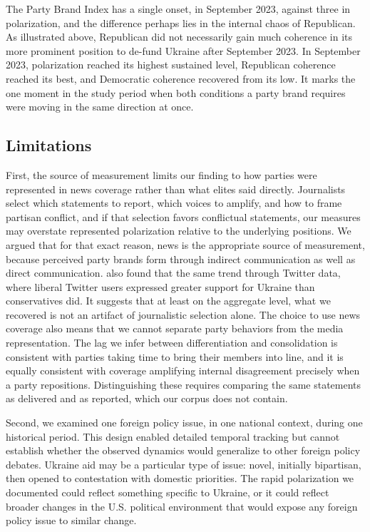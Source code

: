 The Party Brand Index has a single onset, in September 2023, against three in polarization, and the difference perhaps lies in the internal chaos of Republican. As illustrated above, Republican did not necessarily gain much coherence in its more prominent position to de-fund Ukraine after September 2023. In September 2023, polarization reached its highest sustained level, Republican coherence reached its best, and Democratic coherence recovered from its low. It marks the one moment in the study period when both conditions a party brand requires were moving in the same direction at once.

\subsection{Limitations}

First, the source of measurement limits our finding to how parties were represented in news coverage rather than what elites said directly. Journalists select which statements to report, which voices to amplify, and how to frame partisan conflict, and if that selection favors conflictual statements, our measures may overstate represented polarization relative to the underlying positions. We argued that for that exact reason, news is the appropriate source of measurement, because perceived party brands form through indirect communication as well as direct communication. \citet{nomikosAmericanSocialMedia2025} also found that the same trend through Twitter data, where liberal Twitter users expressed greater support for Ukraine than conservatives did. It suggests that at least on the aggregate level, what we recovered is not an artifact of journalistic selection alone. The choice to use news coverage also means that we cannot separate party behaviors from the media representation. The lag we infer between differentiation and consolidation is consistent with parties taking time to bring their members into line, and it is equally consistent with coverage amplifying internal disagreement precisely when a party repositions. Distinguishing these requires comparing the same statements as delivered and as reported, which our corpus does not contain.

Second, we examined one foreign policy issue, in one national context, during one historical period. This design enabled detailed temporal tracking but cannot establish whether the observed dynamics would generalize to other foreign policy debates. Ukraine aid may be a particular type of issue: novel, initially bipartisan, then opened to contestation with domestic priorities. The rapid polarization we documented could reflect something specific to Ukraine, or it could reflect broader changes in the U.S. political environment that would expose any foreign policy issue to similar change.

